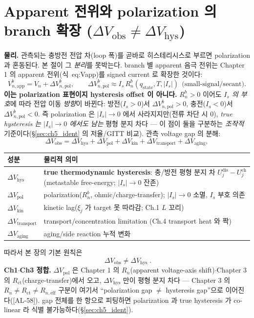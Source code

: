 \documentclass[11pt,a4paper]{article}
\newcommand{\eff}{\mathrm{eff}}
\newcommand{\app}{\mathrm{app}}
\newcommand{\ct}{\mathrm{ct}}
\newcommand{\transp}{\mathrm{transport}}
\newcommand{\dis}{\mathrm{dis}}
\newcommand{\chg}{\mathrm{ch}}
\newcommand{\hys}{\mathrm{hys}}
\newcommand{\pol}{\mathrm{pol}}
\newcommand{\kin}{\mathrm{kin}}
\newcommand{\obs}{\mathrm{obs}}
\newcommand{\stt}{\mathrm{state}}
\newcommand{\AL}[1]{\textsf{[AL-#1]}}
\begin{document}
\section{Apparent 전위와 polarization 의 branch 확장 ($\Delta V_\obs\ne\Delta V_\hys$)}\label{sec:ch5_apparent}
\textbf{물리.} 관측되는 충방전 전압 차(loop 폭)를 곧바로 히스테리시스로 부르면 polarization 과 혼동된다. 본
절이 그 \emph{분리}를 못박는다. branch 별 apparent 음극 전위는 Chapter 1 의 apparent 전위(식~eq:Vapp)를 signed
current 로 확장한 것이다:
\begin{equation}
V_{n,\app}^b=V_n+\Delta V_{n,\pol}^b,\qquad
\Delta V_{n,\pol}^b\approx I_s\,R_n^b(q_\stt,T,|I_s|)\ \ \text{(small-signal/secant)}.
\label{eq:ch5_vapp_branch}
\end{equation}
\textbf{이는 polarization 표현이지 hysteresis offset 이 아니다.} $R_n^b>0$ 이어도 \emph{$I_s$ 의 부호}에 따라
전압 이동 \emph{방향}이 바뀐다: 방전($I_s>0$)서 $\Delta V_{n,\pol}^b>0$, 충전($I_s<0$)서 $\Delta V_{n,\pol}^b<0$.
즉 polarization 은 $|I_s|\to0$ 에서 사라지지만(전류 차단 시 0), \emph{true hysteresis 는 $|I_s|\to0$ 에서도
남는} 평형 분지 차다 — 이 점이 둘을 구분하는 \emph{조작적} 기준이다(\S\ref{sec:ch5_ident} 의 저율/GITT 비교).
관측 voltage gap 의 분해:
\begin{equation}
\Delta V_\obs=\Delta V_\hys+\Delta V_\pol+\Delta V_\kin+\Delta V_\transp+\Delta V_{\mathrm{aging}},
\label{eq:ch5_gap_decomp}
\end{equation}
\begin{longtable}{p{} >{\raggedright\arraybackslash}p{}}
\toprule 성분 & 물리적 의미 \\ \midrule \endhead
$\Delta V_\hys$ & \textbf{true thermodynamic hysteresis}: 충/방전 평형 분지 차 $U_j^\dis-U_j^\chg$ (metastable free-energy; $|I_s|\to0$ 잔존) \\
$\Delta V_\pol$ & polarization($R_n^b$, ohmic/charge-transfer); $|I_s|\to0$ 소멸, $I_s$ 부호 의존 \\
$\Delta V_\kin$ & kinetic lag($\xi_j$ 가 target 못 따라감; Ch.1 $L$ 꼬리) \\
$\Delta V_\transp$ & transport/concentration limitation (Ch.4 transport heat 와 짝) \\
$\Delta V_{\mathrm{aging}}$ & aging/side reaction 누적 변화 \\
\bottomrule
\end{longtable}
따라서 본 장의 기본 원칙은
\begin{equation}
\boxed{\;\Delta V_\obs\ne\Delta V_\hys\;.}
\label{eq:ch5_obs_not_hys}
\end{equation}
\textbf{Ch1$\cdot$Ch3 정합.} $\Delta V_\pol$ 은 Chapter 1 의 $R_n$(apparent voltage-axis shift)$\cdot$Chapter 3
의 $R_\ct$(charge-transfer)에서 오고, $\Delta V_\hys$ 만이 평형 분지 차다 — Chapter 3 의 $R_n\ne R_\ct\ne R_{n,\eff}$
구분이 여기서 ``polarization gap $\ne$ hysteresis gap''으로 이어진다(\AL{58}). gap 전체를 한 항으로 피팅하면
polarization 과 true hysteresis 가 co-linear 라 식별 불가능하다(\S\ref{sec:ch5_ident}).
\end{document}
